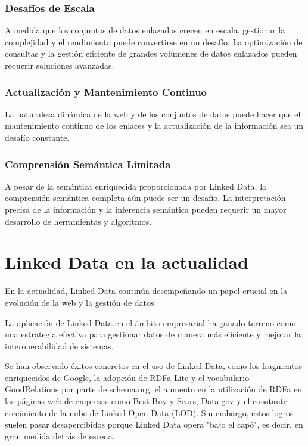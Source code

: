 \documentclass[11pt]{report}
\begin{document}
\subsection*{Desafíos de Escala}

		A medida que los conjuntos de datos enlazados crecen en escala, gestionar la complejidad y el rendimiento puede convertirse en un desafío. La optimización de consultas y la gestión eficiente de grandes volúmenes de datos enlazados pueden requerir soluciones avanzadas.
\subsection*{Actualización y Mantenimiento Continuo}

		La naturaleza dinámica de la web y de los conjuntos de datos puede hacer que el mantenimiento continuo de los enlaces y la actualización de la información sea un desafío constante.
\subsection*{Comprensión Semántica Limitada}

		A pesar de la semántica enriquecida proporcionada por Linked Data, la comprensión semántica completa aún puede ser un desafío. La interpretación precisa de la información y la inferencia semántica pueden requerir un mayor desarrollo de herramientas y algoritmos.

\chapter{Linked Data en la actualidad}
En la actualidad, Linked Data continúa desempeñando un papel crucial en la evolución de la web y la gestión de datos.

La aplicación de Linked Data en el ámbito empresarial ha ganado terreno como una estrategia efectiva para gestionar datos de manera más eficiente y mejorar la interoperabilidad de sistemas.

Se han observado éxitos concretos en el uso de Linked Data, como los fragmentos enriquecidos de Google, la adopción de RDFa Lite y el vocabulario GoodRelations por parte de schema.org, el aumento en la utilización de RDFa en las páginas web de empresas como Best Buy y Sears, Data.gov y el constante crecimiento de la nube de Linked Open Data (LOD). Sin embargo, estos logros suelen pasar desapercibidos porque Linked Data opera "bajo el capó", es decir, en gran medida detrás de escena.
\end{document}
